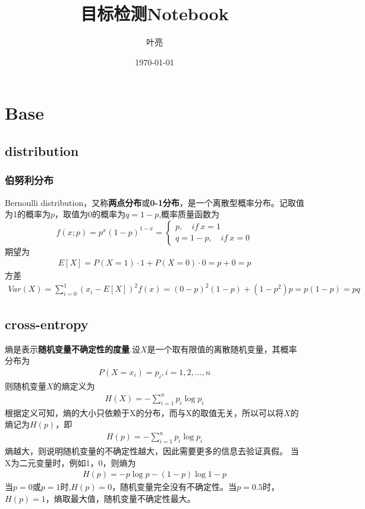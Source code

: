 \documentclass{article}
\title{目标检测Notebook}
\author{叶亮}
\date{\today}
\begin{document}
 
\maketitle
\tableofcontents

\section{Base}
\subsection{distribution}
\subsubsection{伯努利分布}
Bernoulli distribution，又称\textbf{两点分布}或\textbf{0-1分布}，是一个离散型概率分布。记取值为1的概率为$p$，取值为0的概率为$q=1-p$,概率质量函数为
\begin{equation}
f(x;p) =  p^x(1-p)^{1-x} =  \begin{cases}
	p, \quad if\ x=1 \\
	q = 1 - p, \quad if\ x =0
	\end{cases}
\end{equation}
期望为
\begin{align}
E[X] = P(X=1)\cdot 1 + P(X=0) \cdot 0 = p  + 0 = p
\end{align}
方差
\begin{align}
Var(X) = \sum_{i=0}^1(x_i - E[X])^2 f(x) = (0 - p)^2(1-p) + (1-p^2)p = p(1-p) = pq
\end{align}

\subsection{cross-entropy}
熵是表示\textbf{随机变量不确定性的度量}.设$X$是一个取有限值的离散随机变量，其概率分布为
\begin{align}
P(X=x_i) = p_i, i =1,2,..., n
\end{align}
则随机变量$X$的熵定义为
\begin{align}
H(X) = - \sum_{i=1}^n p_i \log{p_i}
\end{align}
根据定义可知，熵的大小只依赖于X的分布，而与X的取值无关，所以可以将$X$的熵记为$H(p)$，即
\begin{align}
H(p) = - \sum_{i=1}^n p_i \log{p_i}
\end{align}
熵越大，则说明随机变量的不确定性越大，因此需要更多的信息去验证真假。
当X为二元变量时，例如1，0，则熵为
\begin{align}
H(p) = -p\log{p} - (1-p)\log{1-p}
\end{align}
当$p=0$或$p=1$时,$H(p)=0$，随机变量完全没有不确定性。当$p=0.5$时，$H(p) = 1$，熵取最大值，随机变量不确定性最大。
\end{document}
